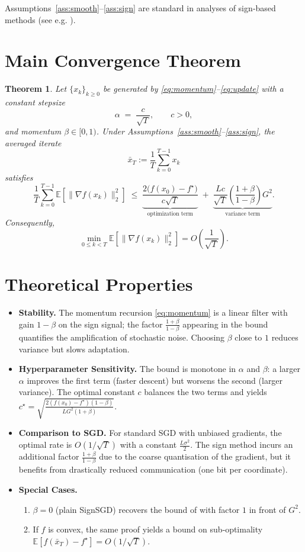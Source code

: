 \documentclass{article}
\newtheorem{theorem}{Theorem}
\newcommand{\E}{\mathbb{E}}
\begin{document}
Assumptions~\ref{ass:smooth}--\ref{ass:sign} are standard in analyses of sign‑based methods (see e.g. \cite{bernstein2018signsgd}).

\section*{Main Convergence Theorem}
\begin{theorem}\label{thm:main}
Let $\{x_{k}\}_{k\ge0}$ be generated by \eqref{eq:momentum}–\eqref{eq:update} with a constant stepsize
\[
\alpha \;=\; \frac{c}{\sqrt{T}},\qquad c>0,
\]
and momentum $\beta\in[0,1)$.  
Under Assumptions~\ref{ass:smooth}–\ref{ass:sign}, the averaged iterate 
\[
\bar x_{T}:=\frac{1}{T}\sum_{k=0}^{T-1}x_{k}
\]
satisfies
\[
\frac{1}{T}\sum_{k=0}^{T-1}\E\!\left[\|\nabla f(x_{k})\|_{2}^{2}\right]
\;\le\;
\underbrace{\frac{2\big(f(x_{0})-f^{\star}\big)}{c\sqrt{T}}}_{\text{optimization term}}
\;+\;
\underbrace{\frac{L c}{\sqrt{T}}\left(\frac{1+\beta}{1-\beta}\right)G^{2}}_{\text{variance term}}.
\]
Consequently,
\[
\min_{0\le k<T}\E\!\left[\|\nabla f(x_{k})\|_{2}^{2}\right]=O\!\left(\frac{1}{\sqrt{T}}\right).
\]
\end{theorem}

\section*{Theoretical Properties}
\begin{itemize}
\item \textbf{Stability.} The momentum recursion \eqref{eq:momentum} is a linear filter with gain $1-\beta$ on the sign signal; the factor $\frac{1+\beta}{1-\beta}$ appearing in the bound quantifies the amplification of stochastic noise. Choosing $\beta$ close to $1$ reduces variance but slows adaptation.
\item \textbf{Hyperparameter Sensitivity.} The bound is monotone in $\alpha$ and $\beta$: a larger $\alpha$ improves the first term (faster descent) but worsens the second (larger variance). The optimal constant $c$ balances the two terms and yields $c^{\star}= \sqrt{\frac{2(f(x_{0})-f^{\star})(1-\beta)}{L G^{2}(1+\beta)}}$.
\item \textbf{Comparison to SGD.} For standard SGD with unbiased gradients, the optimal rate is $O(1/\sqrt{T})$ with a constant $ \frac{L\sigma^{2}}{2}$. The sign method incurs an additional factor $\frac{1+\beta}{1-\beta}$ due to the coarse quantisation of the gradient, but it benefits from drastically reduced communication (one bit per coordinate).
\item \textbf{Special Cases.}
\begin{enumerate}
\item $\beta=0$ (plain SignSGD) recovers the bound of \cite{bernstein2018signsgd} with factor $1$ in front of $G^{2}$.
\item If $f$ is convex, the same proof yields a bound on sub‑optimality $ \E[f(\bar x_{T})-f^{\star}] = O(1/\sqrt{T})$.
\end{enumerate}
\end{itemize}
\end{document}
